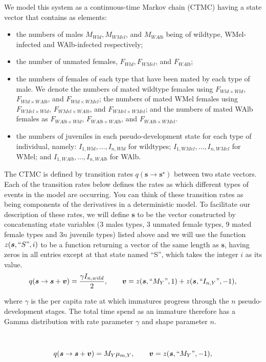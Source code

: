 \documentclass[]{article}  %
\begin{document}
We model this system as a continuous-time Markov chain (CTMC) having a state vector that contains as elements: 
\begin{itemize}
\item  the numbers of males $M_{Wld}, M_{WMel}$, and  $M_{WAlb}$ being of wildtype, WMel-infected and WAlb-infected respectively;
\item the number of unmated females, $F_{Wld}, F_{WMel}$, and $F_{WAlb}$;
\item the numbers of females of each type that have been mated by each type of male.   We denote the numbers of mated wildtype females using $F_{Wld \times Wld}$, $F_{Wld \times WAlb}$, and $F_{Wld \times WMel}$; the numbers of mated WMel females using $F_{WMel \times Wld}$, $F_{WMel \times WAlb}$, and $F_{WMel \times WMel}$; and the numbers of mated WAlb females as $F_{WAlb \times Wld}$, $F_{WAlb \times WAlb}$, and $F_{WAlb \times WMel}$.
\item the numbers of juveniles in each pseudo-development state for each type of individual, namely: $I_{1, Wld}, \dots, I_{n, Wld}$ for wildtypes; $I_{1, WMel}, \dots, I_{n, WMel}$ for WMel; and $I_{1, WAlb}, \dots, I_{n, WAlb}$ for WAlb.
\end{itemize}

The CTMC is defined by transition rates $q(\boldsymbol{s} \rightarrow \boldsymbol{s}^\star)$ between two state vectors.  Each of the transition rates below defines the rates as which different types of events in the model are occurring. You can think of these transition rates as being components of the derivatives in a deterministic model.  To facilitate our description of these rates, we will define $\boldsymbol{s}$ to be the vector constructed by concatenating state variables (3 males types, 3 unmated female types, 9 mated female types and $3n$ juvenile types) listed above and we will use the function $z(\boldsymbol{s}, \textup{``}S \textup{''} , i)$ to be a function returning a vector of the same length as $\boldsymbol{s}$, having zeros in all entries except at that state named ``S'', which takes the integer $i$ as its value. \\

$$q(\boldsymbol{s} \rightarrow \boldsymbol{s} + \boldsymbol{v}) = \frac{ \gamma I_{n, wild}}{2}, \qquad \boldsymbol{v} = z(\boldsymbol{s}, \textup{``}M_Y\textup{''}, 1) + z(\boldsymbol{s}, \textup{``} I_{n, Y} \textup{''} , -1),$$

\noindent where $\gamma$ is the per capita rate at which immatures progress through the $n$ pseudo-development stages.  The total time spend as an immature therefore has a Gamma distribution with rate parameter $\gamma$ and shape parameter $n$.
\\
\\
\\
$$q(\boldsymbol{s} \rightarrow \boldsymbol{s} + \boldsymbol{v}) = M_{Y} \mu_{m, Y}, \qquad \boldsymbol{v} =  z(\boldsymbol{s}, \textup{``} M_{Y} \textup{''} , -1),$$
\end{document}
